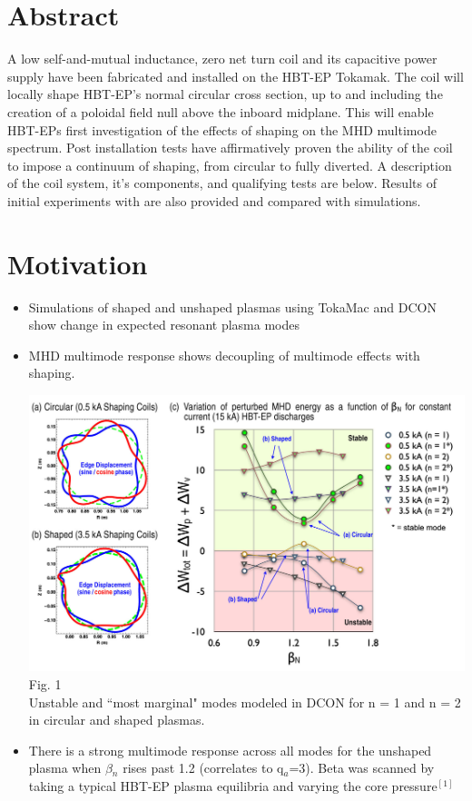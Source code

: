 \documentclass{article}
\begin{document}
\begin{multicols}{5}
\section{Abstract}
A low self-and-mutual inductance, zero net turn coil and its capacitive power supply have been fabricated and installed on the HBT-EP Tokamak.  The coil will locally shape HBT-EP's normal circular cross section, up to and including the creation of a poloidal field null above the inboard midplane.  This will enable HBT-EPs first investigation of the effects of shaping on the MHD multimode spectrum.  Post installation tests have affirmatively proven the ability of the coil to impose a continuum of shaping, from circular to fully diverted. A description of the coil system, it's components, and qualifying tests are below.  Results of initial experiments with are also provided and compared with simulations.\\
\section{Motivation}
\begin{itemize}
\item Simulations of shaped and unshaped plasmas using TokaMac and DCON show change in expected resonant plasma modes
\item MHD multimode response shows decoupling of multimode effects with shaping.\\
\begin{center}
\includegraphics[width=0.9\columnwidth]{ModeDWimage2}\\
\vspace{.25in}
Fig. 1\\
Unstable and ``most marginal" modes modeled in DCON for n = 1 and n = 2 in circular and shaped plasmas.\\
\end{center}
\item There is a strong multimode response across all modes for the unshaped plasma when  $\beta$$_n$ rises past 1.2 (correlates to q$_a$=3).  Beta was scanned by taking a typical HBT-EP plasma equilibria and varying the core pressure$^{[1]}$


\end{itemize}
\end{multicols}
\end{document}
